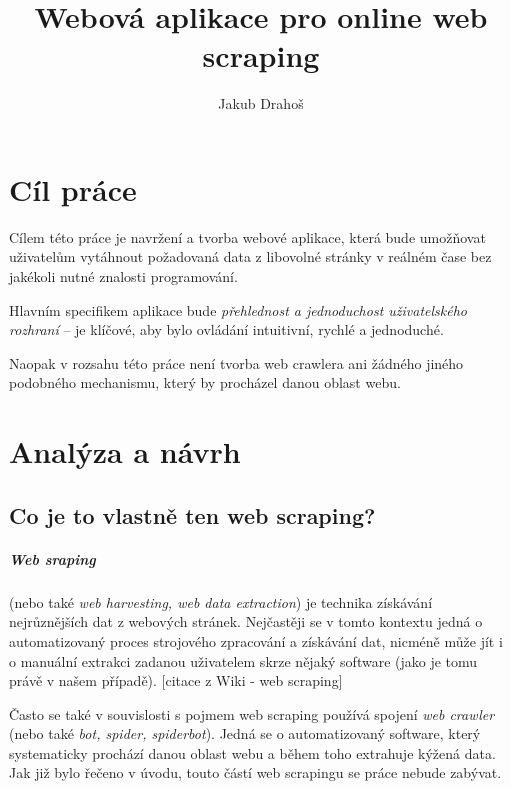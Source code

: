 \documentclass[thesis=B,czech]{FITthesis}[2012/06/26]
\title{Webová aplikace pro online web scraping}
\author{Jakub Drahoš} %
\begin{document}

\begin{introduction}
\end{introduction}


\chapter{Cíl práce}

Cílem této práce je navržení a tvorba webové aplikace, která bude umož\v{n}ovat uživatelům vytáhnout požadovaná data z libovolné stránky v reálném čase bez jakékoli nutné znalosti programování.

Hlavním specifikem aplikace bude \emph{přehlednost a jednoduchost uživatelského rozhraní} -- je klíčové, aby bylo ovládání intuitivní, rychlé a jednoduché.

Naopak v rozsahu této práce není tvorba web crawlera ani žádného jiného podobného mechanismu, který by procházel danou oblast webu.


\chapter{Analýza a návrh}

\section{Co je to vlastně ten web scraping?}
\paragraph{Web sraping}
(nebo také \emph{web harvesting, web data extraction}) je technika získávání nejrůznějších dat z webových stránek. Nejčastěji se v tomto kontextu jedná o automatizovaný proces strojového zpracování a získávání dat, nicméně může jít i o manuální extrakci zadanou uživatelem skrze nějaký software (jako je tomu právě v našem případě). [citace z Wiki - web scraping]

Často se také v souvislosti s pojmem web scraping používá spojení \emph{web crawler} (nebo také \emph{bot, spider, spiderbot}). Jedná se o automatizovaný software, který systematicky prochází danou oblast webu a během toho extrahuje kýžená data. Jak již bylo řečeno v úvodu, touto částí web scrapingu se práce nebude zabývat.
\end{document}
